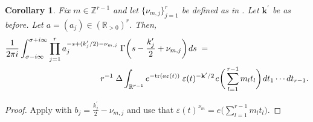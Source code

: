 \documentclass[11pt]{amsart}
\newtheorem{corol}[theorem]{Corollary}
\theoremstyle{remark}
\newcommand\mbf[1]{\mathbf{#1}}
\newcommand{\inte}{\mathbb{Z}}
\newcommand{\real}{\mathbb{R}}
\newcommand{\eps}{\varepsilon}
\newcommand{\eq}{\;=\;}
\def\thin{{\hskip 1pt}}
\newcommand{\tr}{\mathrm{tr}}
\begin{document}
\begin{corol}
\label{gammainversemellin-corol}
Fix $m\in\inte^{r-1}$ and let $\{\nu_{m,j}\}_{j=1}^r$ be defined as in . Let $\mbf{k}^\prime$ be as before. Let $a=(a_j)\in(\real_{>0})^r$. Then, 
\begin{equation}
\begin{aligned}
\label{gammainversemellin}
    &\frac{1}{2\pi i}\int_{\sigma-i\infty}^{\sigma+i\infty}\prod_{j=1}^r a_j^{-s+(k_j^\prime/2)-\nu_{m,j}}\;\Gamma\bigg(s-\frac{k_j^\prime}{2}+\nu_{m,j}\bigg)\thin ds\eq \\
    &\hspace{4cm}r^{-1}\;\Delta\int_{\real^{r-1}}e^{-\tr(a\eps(t))}\;\eps(t)^{-\mbf{k}^\prime/2}\thin e\bigg(\sum_{l=1}^{r-1}m_lt_l\bigg)\thin dt_1\cdots dt_{r-1}.
\end{aligned}
\end{equation}
\end{corol}
\begin{proof}
Apply  with $b_j=\frac{k_j^\prime}{2}-\nu_{m,j}$ and use that $\eps(t)^{\nu_m}=e\big(\sum_{l=1}^{r-1}m_lt_l\big)$.
\end{proof}
\end{document}
